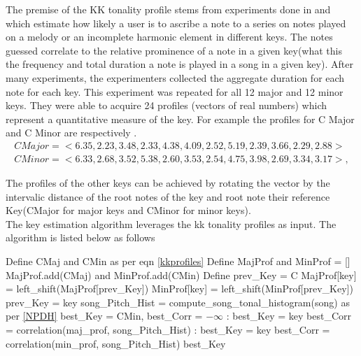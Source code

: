 \noindent The premise of the KK tonality profile stems from experiments done in \cite{kkTonalityKeyFinding} and \cite{kkcognitive} which estimate how likely a user is to ascribe a note to a series on notes played on a melody or an incomplete harmonic element in different keys. The notes guessed correlate to the relative prominence of a note in a given key(what this the frequency and total duration a note is played in a song in a given key). After many experiments, the experimenters collected the aggregate duration for each note for each key. This experiment was  repeated for all 12 major and 12 minor keys. They were able to acquire 24 profiles (vectors of real numbers) which represent a quantitative measure of the key. For example the profiles for C Major and C Minor are respectively \cite{kkcognitive}.
\begin{equation} \label{kkprofiles}
\begin{aligned}
  CMajor = <6.35, 2.23, 3.48, 2.33, 4.38, 4.09, 2.52, 5.19, 2.39, 3.66, 2.29, 2.88> \\
  CMinor = <6.33, 2.68, 3.52, 5.38, 2.60, 3.53, 2.54, 4.75, 3.98, 2.69, 3.34, 3.17>, 
\end{aligned}
\end{equation}

\noindent The profiles of the other keys can be achieved by rotating the vector by the intervalic distance of the root notes of the key and root note their reference Key(CMajor for major keys and CMinor for minor keys). \\

\noindent The key estimation algorithm leverages the kk tonality profiles as input. The algorithm is listed below as follows \cite{kkTonalityKeyFinding}

\begin{algorithm}

\label{CHalgorithm}
\begin{algorithmic}[1]
 {}
\State Define CMaj and CMin as per eqn \ref{kkprofiles}
\State Define MajProf and MinProf = [] %
\State MajProf.add(CMaj) and MinProf.add(CMin)
\State Define prev\_Key = C 
\State MajProf[key] = left\_shift(MajProf[prev\_Key])
\State MinProf[key] = left\_shift(MinProf[prev\_Key])
\State prev\_Key = key
\EndFor
\State song\_Pitch\_Hist = compute\_song\_tonal\_histogram(song) as per \ref{NPDH}
\State best\_Key = CMin, best\_Corr = $-\infty$
:
\State best\_Key = key
\State best\_Corr = correlation(maj\_prof, song\_Pitch\_Hist)
\EndIf
\EndFor
{}:
\State best\_Key = key
\State best\_Corr = correlation(min\_prof, song\_Pitch\_Hist)
\EndIf
\EndFor
\Return best\_Key
\EndProcedure
\end{algorithmic}
\end{algorithm}

